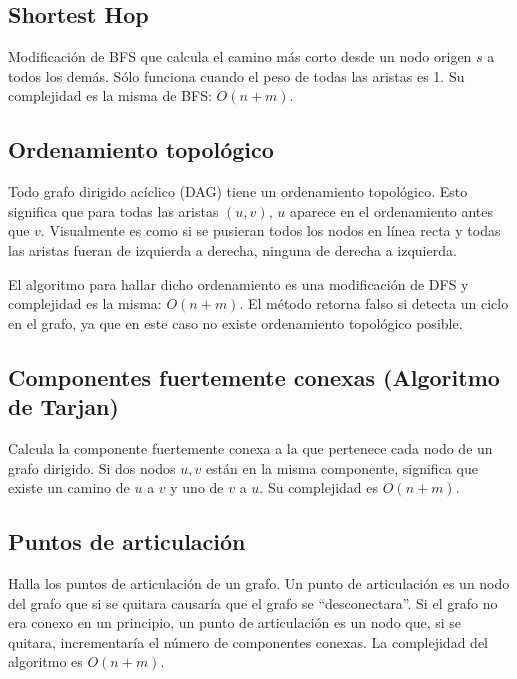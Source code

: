 \documentclass{article}
\begin{document}
\begin{multicols}{2}
	\subsection{Shortest Hop}
	Modificación de BFS que calcula el camino más corto desde un nodo origen \( s \) a todos los demás. Sólo funciona cuando el peso de todas las aristas es 1. Su complejidad es la misma de BFS: \( O(n + m) \).
	
	
	\subsection{Ordenamiento topológico}
	Todo grafo dirigido acíclico (DAG) tiene un ordenamiento topológico. Esto significa que para todas las aristas \( (u,v) \), \(u\) aparece en el ordenamiento antes que \(v\). Visualmente es como si se pusieran todos los nodos en línea recta y todas las aristas fueran de izquierda a derecha, ninguna de derecha a izquierda. 
	
	El algoritmo para hallar dicho ordenamiento es una modificación de DFS y complejidad es la misma: \( O(n + m) \). El método retorna falso si detecta un ciclo en el grafo, ya que en este caso no existe ordenamiento topológico posible.
	
	
	\subsection{Componentes fuertemente conexas (Algoritmo de Tarjan)}
	Calcula la componente fuertemente conexa a la que pertenece cada nodo de un grafo dirigido. Si dos nodos \( u, v \) están en la misma componente, significa que existe un camino de \( u \) a \( v \) y uno de \( v \) a \( u \). Su complejidad es \( O(n + m) \).
	
	
	\subsection{Puntos de articulación}
	Halla los puntos de articulación de un grafo. Un punto de articulación es un nodo del grafo que si se quitara causaría que el grafo se ``desconectara''. Si el grafo no era conexo en un principio, un punto de articulación es un nodo que, si se quitara, incrementaría el número de componentes conexas. La complejidad del algoritmo es \( O(n + m) \).
	
	

\end{multicols}
\end{document}
